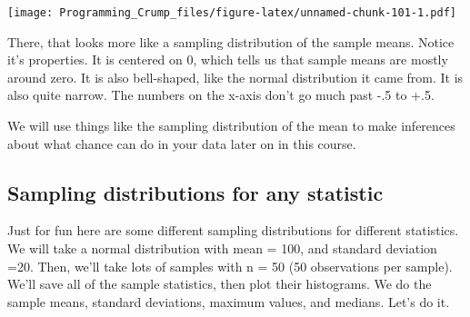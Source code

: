 \documentclass[]{book}
\newenvironment{Shaded}{\begin{snugshade}}{\end{snugshade}}
\newcommand{\KeywordTok}[1]{\textcolor[rgb]{0.13,0.29,0.53}{\textbf{{#1}}}}
\newcommand{\DataTypeTok}[1]{\textcolor[rgb]{0.13,0.29,0.53}{{#1}}}
\newcommand{\DecValTok}[1]{\textcolor[rgb]{0.00,0.00,0.81}{{#1}}}
\newcommand{\StringTok}[1]{\textcolor[rgb]{0.31,0.60,0.02}{{#1}}}
\newcommand{\CommentTok}[1]{\textcolor[rgb]{0.56,0.35,0.01}{\textit{{#1}}}}
\newcommand{\NormalTok}[1]{{#1}}
\theoremstyle{definition}
\theoremstyle{definition}
\theoremstyle{definition}
\theoremstyle{remark}
\begin{document}
\begin{Shaded}
\end{Shaded}

\texttt{[image: Programming\_Crump\_files/figure-latex/unnamed-chunk-101-1.pdf]}

There, that looks more like a sampling distribution of the sample means.
Notice it's properties. It is centered on 0, which tells us that sample
means are mostly around zero. It is also bell-shaped, like the normal
distribution it came from. It is also quite narrow. The numbers on the
x-axis don't go much past -.5 to +.5.

We will use things like the sampling distribution of the mean to make
inferences about what chance can do in your data later on in this
course.

\subsection{Sampling distributions for any
statistic}\label{sampling-distributions-for-any-statistic}

Just for fun here are some different sampling distributions for
different statistics. We will take a normal distribution with mean =
100, and standard deviation =20. Then, we'll take lots of samples with n
= 50 (50 observations per sample). We'll save all of the sample
statistics, then plot their histograms. We do the sample means, standard
deviations, maximum values, and medians. Let's do it.
\end{document}
